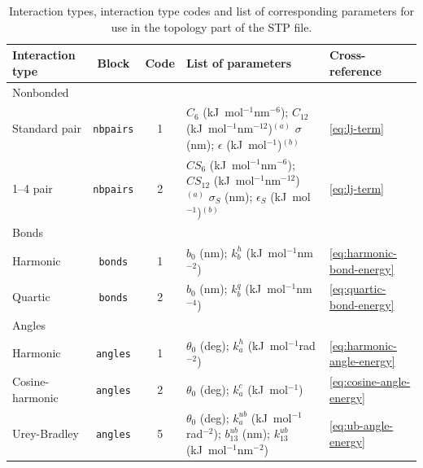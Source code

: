 \documentclass[10pt,a4paper]{report}
\numberwithin{equation}{section}
\begin{document}
\begin{table}[tb]
  \centering
  \caption{Interaction types, interaction type codes and list of corresponding parameters for use in the topology part of the STP file.}
  \label{table:stp-types}
  \vspace{2ex}\par
  \begin{tabular}{lccp{49ex}l}
    \toprule
Interaction type & Block & Code & List of parameters & Cross-reference\\
\midrule
Nonbonded & &  &  & \\
\hspace{1ex} Standard pair & \texttt{nbpairs} &  1 & $C_6$ (kJ~mol$^{-1}$nm$^{-6}$); $C_{12}$ (kJ~mol$^{-1}$nm$^{-12}$)$^{(a)}$ \newline $\sigma$ (nm); $\epsilon$ (kJ~mol$^{-1}$)$^{(b)}$& \autoref{eq:lj-term}\\
\hspace{1ex} 1--4 pair & \texttt{nbpairs} &  2 & $CS_6$ (kJ~mol$^{-1}$nm$^{-6}$); $CS_{12}$ (kJ~mol$^{-1}$nm$^{-12}$)$^{(a)}$ \newline $\sigma_S$ (nm); $\epsilon_S$ (kJ~mol$^{-1}$)$^{(b)}$ & \autoref{eq:lj-term}\\
\hline
Bonds &  &  & \\
\hspace{1ex} Harmonic & \texttt{bonds} &  1 & \(b_0\) (nm); \(k_b^h\) (kJ~mol$^{-1}$nm$^{-2}$) & \autoref{eq:harmonic-bond-energy}\\
\hspace{1ex} Quartic & \texttt{bonds} &  2 & \(b_0\) (nm); \(k_b^q\) (kJ~mol$^{-1}$nm$^{-4}$) & \autoref{eq:quartic-bond-energy}\\
\hline
Angles & &  &  & \\
\hspace{1ex} Harmonic & \texttt{angles} &  1 & \(\theta_0\) (deg); \(k_a^h\) (kJ~mol$^{-1}$rad$^{-2}$) & \autoref{eq:harmonic-angle-energy}\\
\hspace{1ex} Cosine-harmonic & \texttt{angles} &  2 & \(\theta_0\) (deg); \(k_a^c\) (kJ~mol$^{-1}$) &\autoref{eq:cosine-angle-energy}\\
\hspace{1ex} Urey-Bradley & \texttt{angles} &  5 & \(\theta_0\) (deg); \(k_a^{ub}\) (kJ~mol$^{-1}$rad$^{-2}$); \newline \(b_{13}^{ub}\) (nm); \(k_{13}^{ub}\) (kJ~mol$^{-1}$nm$^{-2}$) & \autoref{eq:ub-angle-energy}\\
\hline

\end{tabular}
\end{table}
\end{document}
